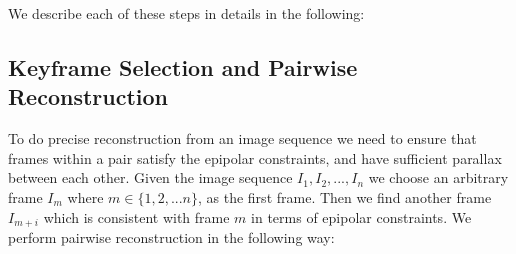 We describe each of these steps in details in the following:

\subsection{Keyframe Selection and Pairwise Reconstruction}\label{subsec:pairwiserecons}

To do precise reconstruction from an image sequence we need to ensure that frames within a pair satisfy the epipolar constraints, and have sufficient parallax between each other. Given the image sequence $I_1,I_2,...,I_n$ we choose an arbitrary frame $I_m$ where $m\in \{1,2,...n\}$, as the first frame. Then we find another frame $I_{m+i}$ which is consistent with frame $m$ in terms of epipolar constraints. We perform pairwise reconstruction in the following way:


